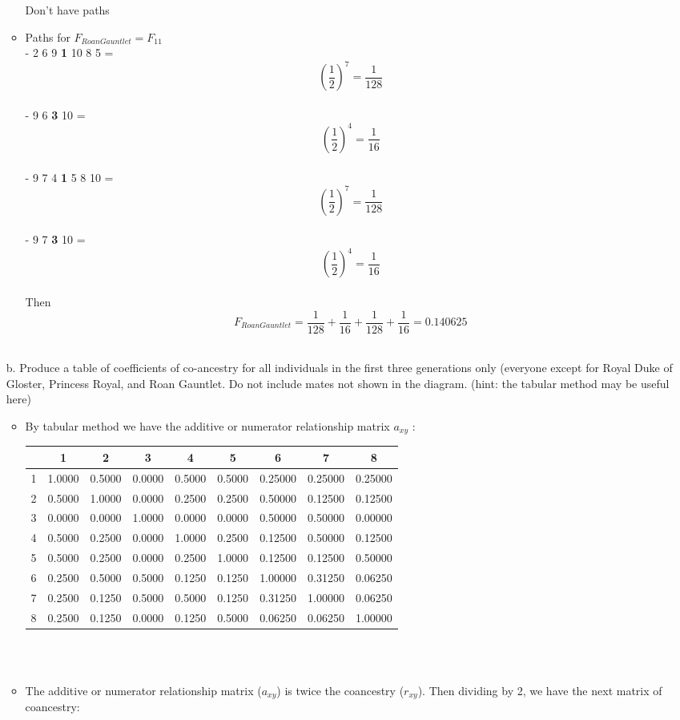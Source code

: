 \documentclass[a4paper, 11pt]{article}
\begin{document}
\begin{enumerate}
\begin{itemize}
Don't have paths\\

\item Paths for $F_{Roan Gauntlet} = F_{11}$\\

- 2 6 9  \textbf{1} 10 8 5  = \[(\frac{1}{2})^7 = \frac{1}{128}\] \\
- 9 6 \textbf{3} 10 = \[(\frac{1}{2})^4 = \frac{1}{16}\]\\
- 9 7 4  \textbf{1} 5 8 10 = \[(\frac{1}{2})^7 = \frac{1}{128}\]\\
- 9 7 \textbf{3} 10 = \[(\frac{1}{2})^4 = \frac{1}{16}\]\\
Then \[F_{Roan Gauntlet} = \frac{1}{128} + \frac{1}{16}+ \frac{1}{128}+ \frac{1}{16} = 0.140625 \]\\

\end{itemize}

\subitem b. Produce a table of coefficients of co-ancestry for all individuals in the first three generations only (everyone except for Royal Duke of Gloster, Princess Royal, and Roan Gauntlet. Do not include mates not shown in the diagram. (hint: the tabular method may be useful here)

\begin{itemize}
\item By tabular method we have the additive or numerator relationship matrix \(a_{xy}\) :

\begin{tabular}{|c|c|c|c|c|c|c|c|c|}
\hline
	&	1      	&	2     	&	3	      &	4	      &	5	      &	6      	&	7     	&	8 \\ \hline
1	&	1.0000	&	0.5000	&	0.0000	&	0.5000	&	0.5000	&	0.25000	&	0.25000	&	0.25000 \\ \hline
2	&	0.5000	&	1.0000	&	0.0000	&	0.2500	&	0.2500	&	0.50000	&	0.12500	&	0.12500 \\ \hline
3	&	0.0000	&	0.0000	&	1.0000	&	0.0000	&	0.0000	&	0.50000	&	0.50000	&	0.00000 \\ \hline
4	&	0.5000	&	0.2500	&	0.0000	&	1.0000	&	0.2500	&	0.12500	&	0.50000	&	0.12500 \\ \hline
5	&	0.5000	&	0.2500	&	0.0000	&	0.2500	&	1.0000	&	0.12500	&	0.12500	&	0.50000 \\ \hline
6	&	0.2500	&	0.5000	&	0.5000	&	0.1250	&	0.1250	&	1.00000	&	0.31250	&	0.06250 \\ \hline
7	&	0.2500	&	0.1250	&	0.5000	&	0.5000	&	0.1250	&	0.31250	&	1.00000	&	0.06250 \\ \hline
8	&	0.2500	&	0.1250	&	0.0000	&	0.1250	&	0.5000	&	0.06250	&	0.06250	&	1.00000 \\ \hline
\end{tabular}
\\\\
\item The additive or numerator relationship matrix (\(a_{xy}\)) is twice the coancestry (\(r_{xy}\)). Then dividing by 2, we have the next matrix of coancestry:


\end{itemize}
\end{enumerate}
\end{document}
